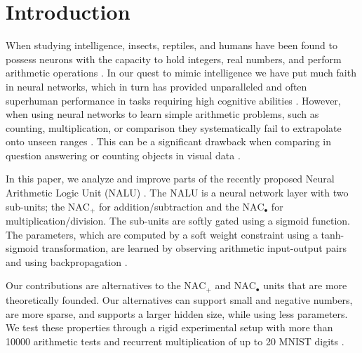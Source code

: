 \section{Introduction}
When studying intelligence, insects, reptiles, and humans have been found to possess neurons with the capacity to hold integers, real numbers, and perform arithmetic operations \cite{nieder-neuronal-number,rugani-arithmetic-chicks,gallistel-numbers-in-brain}.
In our quest to mimic intelligence we have put much faith in neural networks, which in turn has provided unparalleled and often superhuman performance in tasks requiring high cognitive abilities \cite{natureGo,bert,openai-learning-dexterous}.
However, when using neural networks to learn simple arithmetic problems, such as counting, multiplication, or comparison they systematically fail to extrapolate onto unseen ranges \cite{stillNotSystematic,suzgun2019evaluating,trask-nalu}. This can be a significant drawback when comparing in question answering \cite{naturalquestions} or counting objects in visual data \cite{johnson2017clevr,drewspaper}.

In this paper, we analyze and improve parts of the recently proposed Neural Arithmetic Logic Unit (NALU) \cite{trask-nalu}.
The NALU is a neural network layer with two sub-units; the $\text{NAC}_{+}$ for addition/subtraction and the $\text{NAC}_{\bullet}$ for multiplication/division.
The sub-units are softly gated using a sigmoid function. The parameters, which are computed by a soft weight constraint using a tanh-sigmoid transformation, are learned by observing arithmetic input-output pairs and using backpropagation \cite{rumelhart1986learning}.

Our contributions are alternatives to the $\text{NAC}_{+}$ and $\text{NAC}_{\bullet}$ units that are more theoretically founded. Our alternatives can support small and negative numbers, are more sparse, and supports a larger hidden size, while using less parameters.
We test these properties through a rigid experimental setup with more than 10000 arithmetic tests and recurrent multiplication of up to 20 MNIST digits \cite{mnist}.

